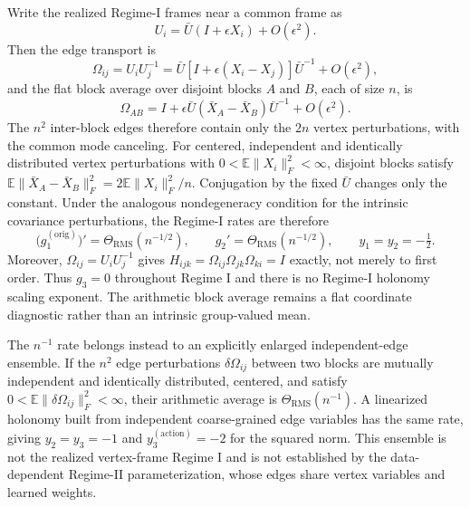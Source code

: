 \documentclass[twoside,11pt]{article}
\begin{document}
Write the realized Regime-I frames near a common frame as
\begin{equation}
U_i=\bar U(I+\epsilon X_i)+O(\epsilon^2).
\label{eq:regime_i_vertex_fluctuations}
\end{equation}
Then the edge transport is
\begin{equation}
\Omega_{ij}=U_iU_j^{-1}
=\bar U\left[I+\epsilon(X_i-X_j)\right]\bar U^{-1}+O(\epsilon^2),
\label{eq:regime_i_edge_fluctuations}
\end{equation}
and the flat block average over disjoint blocks $A$ and $B$, each of size $n$, is
\begin{equation}
\Omega_{AB}
=I+\epsilon\bar U(\bar X_A-\bar X_B)\bar U^{-1}+O(\epsilon^2).
\label{eq:regime_i_block_transport}
\end{equation}
The $n^2$ inter-block edges therefore contain only the $2n$ vertex perturbations, with the common mode canceling. For centered, independent and identically distributed vertex perturbations with $0<\mathbb{E}\|X_i\|_F^2<\infty$, disjoint blocks satisfy $\mathbb{E}\|\bar X_A-\bar X_B\|_F^2=2\mathbb{E}\|X_i\|_F^2/n$. Conjugation by the fixed $\bar U$ changes only the constant. Under the analogous nondegeneracy condition for the intrinsic covariance perturbations, the Regime-I rates are therefore
\begin{equation}
\bigl(g_1^{(\mathrm{orig})}\bigr)'=\Theta_{\mathrm{RMS}}(n^{-1/2}),
\qquad
g_2'=\Theta_{\mathrm{RMS}}(n^{-1/2}),
\qquad
y_1=y_2=-\tfrac{1}{2}.
\label{eq:rg_scaling}
\end{equation}
Moreover, $\Omega_{ij}=U_iU_j^{-1}$ gives $H_{ijk}=\Omega_{ij}\Omega_{jk}\Omega_{ki}=I$ exactly, not merely to first order. Thus $g_3=0$ throughout Regime I and there is no Regime-I holonomy scaling exponent. The arithmetic block average remains a flat coordinate diagnostic rather than an intrinsic group-valued mean.

The $n^{-1}$ rate belongs instead to an explicitly enlarged independent-edge ensemble. If the $n^2$ edge perturbations $\delta\Omega_{ij}$ between two blocks are mutually independent and identically distributed, centered, and satisfy $0<\mathbb{E}\|\delta\Omega_{ij}\|_F^2<\infty$, their arithmetic average is $\Theta_{\mathrm{RMS}}(n^{-1})$. A linearized holonomy built from independent coarse-grained edge variables has the same rate, giving $y_2=y_3=-1$ and $y_3^{(\mathrm{action})}=-2$ for the squared norm. This ensemble is not the realized vertex-frame Regime I and is not established by the data-dependent Regime-II parameterization, whose edges share vertex variables and learned weights.
\end{document}
